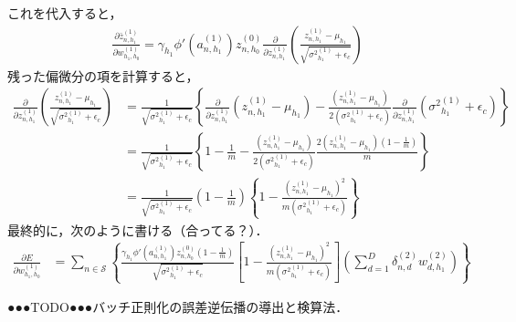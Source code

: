 これを代入すると，
\begin{align*}
 \frac{\partial \bar{z}^{(1)}_{n,h_1}}{\partial w^{(1)}_{h_1,h_0}}
 =
 \gamma_{h_1} \phi'(a^{(1)}_{n,h_1})z^{(0)}_{n,h_0}
  \frac{\partial }{\partial z^{(1)}_{n,h_1}}
  \left( \frac{z^{(1)}_{n,h_1}-\mu_{h_1}}
 {\sqrt{{\sigma^2}^{(1)}_{h_1}+\epsilon_c}} \right)
\end{align*}
残った偏微分の項を計算すると，
\begin{align*}
  \frac{\partial }{\partial z^{(1)}_{n,h_1}}
  \left( \frac{z^{(1)}_{n,h_1}-\mu_{h_1}}
 {\sqrt{{\sigma^2}^{(1)}_{h_1}+\epsilon_c}} \right)
 &=
 \frac{1}
{\sqrt{{\sigma^2}^{(1)}_{h_1}+\epsilon_c}}
\left\{
 \frac{\partial }{\partial z^{(1)}_{n,h_1}}(z^{(1)}_{n,h_1}-\mu_{h_1})
 -
 \frac{(z^{(1)}_{n,h_1}-\mu_{h_1})}{2({\sigma^2}^{(1)}_{h_1}+\epsilon_c)}\frac{\partial }{\partial z^{(1)}_{n,h_1}}({\sigma^2}^{(1)}_{h_1}+\epsilon_c)
 \right\}
 \\
 &=
 \frac{1}
{\sqrt{{\sigma^2}^{(1)}_{h_1}+\epsilon_c}}
\left\{
 1-\frac{1}{m}
 -
 \frac{(z^{(1)}_{n,h_1}-\mu_{h_1})}{2({\sigma^2}^{(1)}_{h_1}+\epsilon_c)}\frac{2(z^{(1)}_{n,h_1}-\mu_{h_1})(1-\frac{1}{m})}{m}
 \right\}
 \\
 &=
 \frac{1}
{\sqrt{{\sigma^2}^{(1)}_{h_1}+\epsilon_c}}
\left(1-\frac{1}{m}\right)
\left\{
 1
 -
 \frac{(z^{(1)}_{n,h_1}-\mu_{h_1})^2}{m({\sigma^2}^{(1)}_{h_1}+\epsilon_c)}
 \right\}
\end{align*}
最終的に，次のように書ける（合ってる？）．
\begin{align*}
\frac{\partial E}{\partial w^{(1)}_{h_1,h_0}}
&=
\sum_{n\in\mathcal{S}}
\left\{
\frac{\gamma_{h_1} \phi'(a^{(1)}_{n,h_1})z^{(0)}_{n,h_0}(1-\frac{1}{m})}
{\sqrt{{\sigma^2}^{(1)}_{h_1}+\epsilon_c}}
\left[
1
-
\frac{(z^{(1)}_{n,h_1}-\mu_{h_1})^2}{m({\sigma^2}^{(1)}_{h_1}+\epsilon_c)}
\right]
\left(
\sum_{d=1}^{D}
\delta^{(2)}_{n,d}
w^{(2)}_{d,h_1}
\right)
\right\}
\end{align*}

●●●TODO●●●バッチ正則化の誤差逆伝播の導出と検算法．


